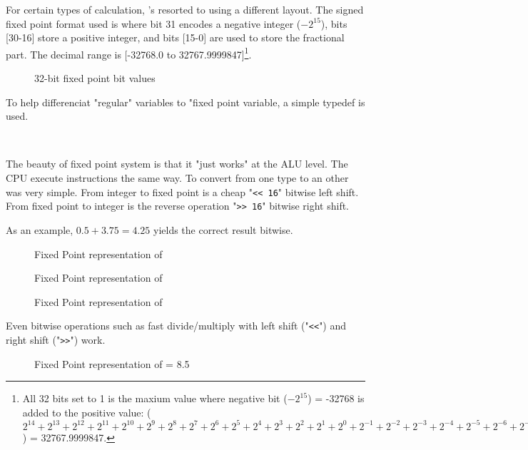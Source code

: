 For certain types of calculation, \doom's resorted to using a different layout. The signed fixed point format used is  where bit 31 encodes a negative integer ($-2^{15}$), bits [30-16] store a positive integer, and bits [15-0] are used to store the fractional part. The decimal range is [-32768.0 to 32767.9999847]\footnote{All 32 bits set to 1 is the maxium value where negative bit ($-2^{15}$) = -32768 is added to the positive value:  
 ($2^{14} + 2^{13} + 2^{12} + 2^{11} + 2^{10} + 2^9 + 2^8 + 2^7 + 2^6 + 2^5 + 2^4 + 2^3 + 2^2 + 2^1 + 2^0 + 2^{-1} + 2^{-2}+ 2^{-3}+ 2^{-4}+ 2^{-5}+ 2^{-6}+ 2^{-7}+ 2^{-8}+ 2^{-9}+ 2^{-10}+ 2^{-11}+ 2^{-12}+ 2^{-13}+ 2^{-14}+ 2^{-15}+ 2^{-16}$) = 32767.9999847.}.\\
\par
\begin{figure}[H]
 \centering
  
  \caption{32-bit \doom{} fixed point bit values}
\end{figure}
\par 
To help differenciat "regular" variables to "fixed point variable, a simple typedef  is used.\\
\par
{}\\
\par
The beauty of fixed point system is that it "just works" at the ALU level. The CPU execute instructions the same way. To convert from one type to an other was very simple. From integer to fixed point is a cheap "\verb!<< 16!" bitwise left shift. From fixed point to integer is the reverse operation "\verb|>> 16|" bitwise right shift.\\
\par


As an example, $0.5 + 3.75 = 4.25$ yields the correct result bitwise.\\
\par
\begin{figure}[H]
  \centering
  
  \caption{Fixed Point representation of }
\end{figure}
\begin{figure}[H]
  \centering
  
  \caption{Fixed Point representation of }
\end{figure}
\begin{figure}[H]
  \centering
  
  \caption{Fixed Point representation of }
\end{figure}
\par
Even bitwise operations such as fast divide/multiply with left shift ("\verb!<<!") and right shift ("\verb|>>|") work.\\
\par
\begin{figure}[H]
  \centering
  
  \caption{Fixed Point representation of  = 8.5}
\end{figure}
\par

